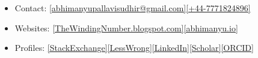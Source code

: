 \documentclass{article}
\begin{document}
\begin{itemize}
    \item Contact:  \href{mailto:abhimanyupallavisudhir@gmail.com}{[abhimanyupallavisudhir@gmail.com]}\href{tel:+44-7771824896}{[+44-7771824896]} %
    \item Websites: \href{https://thewindingnumber.blogspot.com/}{[TheWindingNumber.blogspot.com]}\href{https://abhimanyu.io/}{[abhimanyu.io]}
    \item Profiles: \href{https://math.stackexchange.com/users/78451/abhimanyu-pallavi-sudhir}{[StackExchange]}\href{https://www.lesswrong.com/users/abhimanyu-pallavi-sudhir}{[LessWrong]}\href{https://www.linkedin.com/in/abhimanyu-pallavi-sudhir/}{[LinkedIn]}\href{https://scholar.google.com/citations?user=lb38BjYAAAAJ&hl=en}{[Scholar]}\href{https://orcid.org/my-orcid?orcid=0000-0002-2506-0515}{[ORCID]}
\end{itemize}
\end{document}
